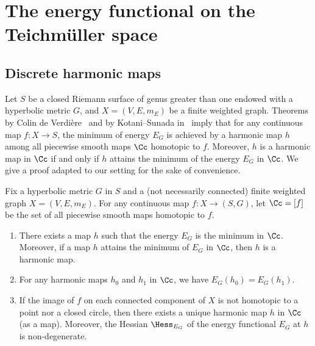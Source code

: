 \section{The energy functional on the Teichm\"uller space}\label{Sec:energyfunctionalTc}

\subsection{Discrete harmonic maps}\label{Sec:harmonic}

Let $S$ be a closed Riemann surface of genus greater than one endowed with a hyperbolic metric $G$, and $X=(V, E, m_E)$ be a finite weighted graph. Theorems by Colin de Verdière~\cite{ColindeVerdiereComment} and by Kotani--Sunada in~\cite{KotaniSunadaStandard} imply that for any continuous map $f:X \to S$, the minimum of energy $E_G$ is achieved by a harmonic map $h$ among all piecewise smooth maps $\Cc$ homotopic to $f$. Moreover, $h$ is a harmonic map in $\Cc$ if and only if $h$ attains the minimum of the energy $E_G$ in $\Cc$. We give a proof adapted to our setting for the sake of convenience.



\begin{theo}\label{Thm:KSharmonic}
Fix a hyperbolic metric $G$ in $S$ and a (not necessarily connected) finite weighted graph $X=(V, E, m_E)$. For any continuous map $f:X \to (S, G)$, let $\Cc=[f]$ be the set of all piecewise smooth maps homotopic to $f$.
\begin{enumerate}\romanenumi
\item \label{theo2.1.1} There exists a map $h$ such that the energy $E_G$ is the minimum in $\Cc$. Moreover, if a map $h$ attains the minimum of $E_G$ in $\Cc$, then $h$ is a harmonic map.
\item \label{theo2.1.2}For any harmonic maps $h_0$ and $h_1$ in $\Cc$, we have $E_G(h_0)=E_G(h_1)$.
\item \label{theo2.1.3}If the image of $f$ on each connected component of $X$ is not homotopic to a point nor a closed circle, then there exists a unique harmonic map $h$ in $\Cc$ (as a map). Moreover, the Hessian ${\Hess}_{E_G}$ of the energy functional $E_G$ at $h$ is non-degenerate.
\end{enumerate}
\end{theo}

